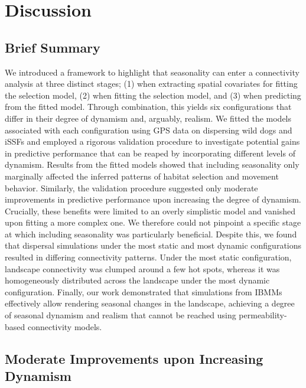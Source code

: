 \documentclass[abstract=on,10pt,a4paper,bibliography=totocnumbered]{article}
\begin{document}
\section{Discussion}

\subsection{Brief Summary}

We introduced a framework to highlight that seasonality can enter a connectivity
analysis at three distinct stages; (1) when extracting spatial covariates for
fitting the selection model, (2) when fitting the selection model, and (3) when
predicting from the fitted model. Through combination, this yields six
configurations that differ in their degree of dynamism and, arguably, realism.
We fitted the models associated with each configuration using GPS data on
dispersing wild dogs and iSSFs and employed a rigorous validation procedure to
investigate potential gains in predictive performance that can be reaped by
incorporating different levels of dynamism. Results from the fitted models
showed that including seasonality only marginally affected the inferred patterns
of habitat selection and movement behavior. Similarly, the validation procedure
suggested only moderate improvements in predictive performance upon increasing
the degree of dynamism. Crucially, these benefits were limited to an overly
simplistic model and vanished upon fitting a more complex one. We therefore
could not pinpoint a specific stage at which including seasonality was
particularly beneficial. Despite this, we found that dispersal simulations under
the most static and most dynamic configurations resulted in differing
connectivity patterns. Under the most static configuration, landscape
connectivity was clumped around a few hot spots, whereas it was homogeneously
distributed across the landscape under the most dynamic configuration. Finally,
our work demonstrated that simulations from IBMMs effectively allow rendering
seasonal changes in the landscape, achieving a degree of seasonal dynamism and
realism that cannot be reached using permeability-based connectivity models.

\subsection{Moderate Improvements upon Increasing Dynamism}
\end{document}
